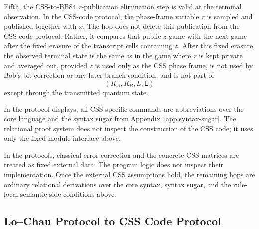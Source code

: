 \documentclass[acmsmall,screen,review,anonymous,nonacm]{acmart}
\theoremstyle{defn_style}
\begin{document}
\begin{theorem}
Fifth, the CSS-to-BB84 \(z\)-publication elimination step is valid at the
terminal observation.  In the CSS-code protocol, the phase-frame variable
\(z\) is sampled and published together with \(x\).  The hop does not delete
this publication from the CSS-code protocol.  Rather, it compares that
public-\(z\) game with the next game after the fixed erasure of the transcript
cells containing \(z\).  After this fixed erasure, the observed terminal state
is the same as in the game where \(z\) is kept private and averaged out,
provided \(z\) is used only as the CSS phase frame, is not used by Bob's bit
correction or any later branch condition, and is not part of
\[
(K_A,K_B,L,\mathsf E)
\]
except through the transmitted quantum state.
\end{theorem}

In the protocol displays, all CSS-specific commands are abbreviations over the
core language and the syntax sugar from Appendix~\ref{app:syntax-sugar}. The
relational proof system does not inspect the construction of the CSS code; it
uses only the fixed module interface above.


In the protocols, classical error correction and the concrete CSS
matrices are treated as fixed external data. The program logic does not inspect
their implementation. Once the external CSS assumptions hold, the remaining
hops are ordinary relational derivations over the core syntax, syntax sugar,
and the rule-local semantic side conditions above.
\newpage
\subsection{Lo--Chau Protocol to CSS Code Protocol}
\end{document}
